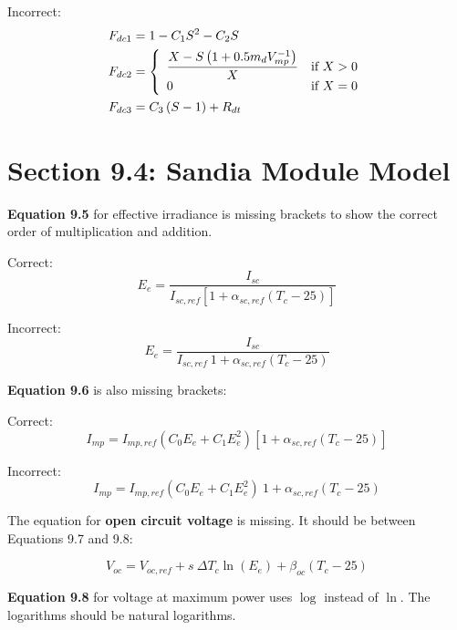 \documentclass[report]{nrel}
\begin{document}
Incorrect:
\begin{align*}
F_{dc1} &= 1-C_1S^2-C_2S \notag\\ %
F_{dc2} &= 
\left\{
   \begin{array}{ll}
      \dfrac{X-S\left(1+0.5 m_d V^{-1}_{mp}\right)}{X} & \text{if $X>0$}\\
      0 & \text{if $X=0$}\\
   \end{array}
\right. \notag\\ %
F_{dc3} &= C_3\left(S-1\right)+R_{dt} %
\end{align*}

\section*{Section 9.4: Sandia Module Model}

\textbf{Equation 9.5} for effective irradiance is missing brackets to show the correct order of multiplication and addition.

Correct:
\begin{equation*}
E_e = \frac{I_{sc}}{I_{sc,ref} \left[1 + \alpha_{sc,ref} (T_c - 25)\right]}
\end{equation*}

Incorrect:
\begin{equation*}
E_e = \frac{I_{sc}}{I_{sc,ref}~1 + \alpha_{sc,ref} (T_c - 25)}
\end{equation*}

\textbf{Equation 9.6} is also missing brackets:

Correct:
\begin{equation*}
I_{mp} = I_{mp,ref} (C_0 E_e + C_1 E_e^2) \left[1 + \alpha_{sc,ref} (T_c - 25)\right]
\end{equation*}

Incorrect:
\begin{equation*}
I_{mp} = I_{mp,ref} (C_0 E_e + C_1 E_e^2)~1 + \alpha_{sc,ref} (T_c - 25)
\end{equation*}

The equation for \textbf{open circuit voltage} is missing. It should be between Equations 9.7 and 9.8:

\begin{equation*}
V_{oc} = V_{oc,ref}+ s~\Delta T_c \ln(E_e)+ \beta_{oc} (T_c - 25)
\end{equation*}

\textbf{Equation 9.8} for voltage at maximum power uses $\log$ instead of $\ln$. The logarithms  should be natural logarithms.
\end{document}
